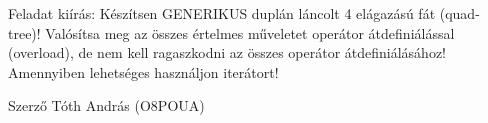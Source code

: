 Feladat kiírás\-: Készítsen G\-E\-N\-E\-R\-I\-K\-U\-S duplán láncolt 4 elágazású fát (quad-\/tree)! Valósítsa meg az összes értelmes műveletet operátor átdefiniálással (overload), de nem kell ragaszkodni az összes operátor átdefiniálásához! Amennyiben lehetséges használjon iterátort! \begin{DoxyAuthor}{Szerző}
Tóth András (O8\-P\-O\-U\-A) 
\end{DoxyAuthor}
